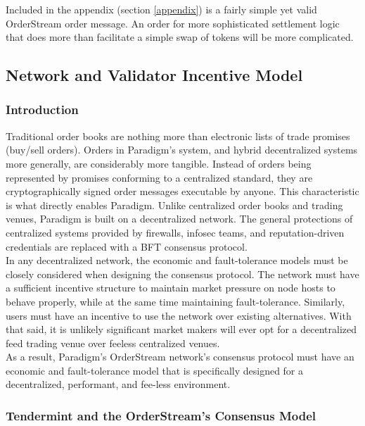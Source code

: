 \documentclass[9pt]{article}
\begin{document}
\noindent Included in the appendix (section \ref{appendix}) is a fairly simple yet valid OrderStream order message. An order for more sophisticated settlement logic that does more than facilitate a simple swap of tokens will be more complicated.

\subsection{Network and Validator Incentive Model}\label{incentive model}

\subsubsection{Introduction}\label{incentive intro}

\noindent Traditional order books are nothing more than electronic lists of trade promises (buy/sell orders). Orders in Paradigm’s system, and hybrid decentralized systems more generally, are considerably more tangible. Instead of orders being represented by promises conforming to a centralized standard, they are cryptographically signed order messages executable by anyone. This characteristic is what directly enables Paradigm. Unlike centralized order books and trading venues, Paradigm is built on a decentralized network. The general protections of centralized systems provided by firewalls, infosec teams, and reputation-driven credentials are replaced with a BFT consensus protocol. \\

\noindent In any decentralized network, the economic and fault-tolerance models must be closely considered when designing the consensus protocol. The network must have a sufficient incentive structure to maintain market pressure on node hosts to behave properly, while at the same time maintaining fault-tolerance. Similarly, users must have an incentive to use the network over existing alternatives. With that said, it is unlikely significant market makers will ever opt for a decentralized feed trading venue over feeless centralized venues. \\

\noindent As a result, Paradigm’s OrderStream network’s consensus protocol must have an economic and fault-tolerance model that is specifically designed for a decentralized, performant, and fee-less environment.

\subsubsection{Tendermint and the OrderStream's Consensus Model}\label{consensus}
\end{document}
